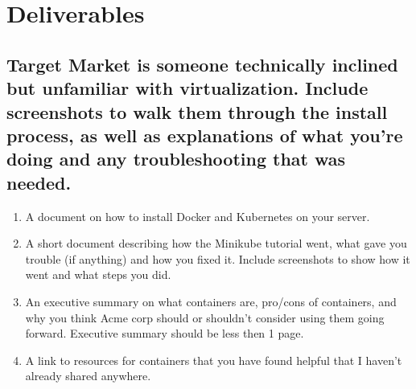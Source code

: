 \documentclass[12pt]{article}
\begin{document}
\section*{Deliverables}
\subsection*{Target Market is someone technically inclined but unfamiliar with virtualization. Include screenshots to walk them through the install process, as well as explanations of what you're doing and any troubleshooting that was needed.}
\begin{enumerate}
    \item A document on how to install Docker and Kubernetes on your server.
    \item A short document describing how the Minikube tutorial went, what gave you trouble (if anything) and how you fixed it. Include screenshots to show how it went and what steps you did.
    \item An executive summary on what containers are, pro/cons of containers, and why you think Acme corp should or shouldn't consider using them going forward.  Executive summary should be less then 1 page. 
    \item A link to resources for containers that you have found helpful that I haven't already shared anywhere.
\end{enumerate}
\end{document}
